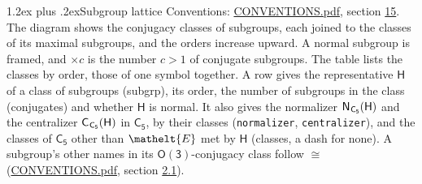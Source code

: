 \documentclass[10pt,a4paper]{article}
\makeatletter
\renewcommand\section{\@startsection{section}{1}{\z@}{-3ex plus -1ex minus -.2ex}%
  {1.2ex plus .2ex}{\normalfont\large\sffamily\bfseries\color{parttitle}}}
\numberwithin{equation}{section}
\newcommand{\eltfont}[1]{{\let\sigma\eltsigma\mathelt{#1}}}
\newcommand{\grp}[1]{\mathsf{#1}}
\newcommand{\cls}[1]{\eltfont{#1}}
\newcommand{\samecls}{\cong}
\newcommand{\hairsp}{\mkern1mu}
\makeatother
\begin{document}
\section{Subgroup lattice}\label{s:subgroups}
Conventions: \href{../../CONVENTIONS.pdf}{CONVENTIONS.pdf}, section \href{../../CONVENTIONS.pdf\#conv.15}{15}.
The diagram shows the conjugacy classes of subgroups, each joined to the classes of its maximal subgroups, and the orders increase upward. \label{n:index.conjugates.c}A normal subgroup is framed, and ${\times}c$ is the number $c > 1$ of conjugate subgroups. The table lists the classes by order, those of one symbol together. \label{n:group.H}\label{n:head.subgroup}\label{n:head.order}\label{n:head.conjugates}\label{n:head.normal}A row gives the representative $\grp{H}$ of a class of subgroups (subgrp), its order, the number of subgroups in the class (conjugates) and whether $\grp{H}$ is normal. \label{n:group.normalizer}\label{n:group.centralizer}\label{n:head.classes}It also gives the normalizer $\grp{N}_{\hairsp \grp{C_{5}}}(\grp{H})$ and the centralizer $\grp{C}_{\hairsp \grp{C_{5}}}(\grp{H})$ in $\grp{C_{5}}$, by their classes (\texttt{normalizer}, \texttt{centralizer}), and the classes of $\grp{C_{5}}$ other than $\cls{E}$ met by $\grp{H}$ (classes, a dash for none). A subgroup's other names in its \href{O3.pdf}{$\grp{O(3)}$}-conjugacy class follow $\samecls$ (\href{../../CONVENTIONS.pdf}{CONVENTIONS.pdf}, section \href{../../CONVENTIONS.pdf\#conv.2.1}{2.1}).
\begin{center}
\end{center}
\end{document}
